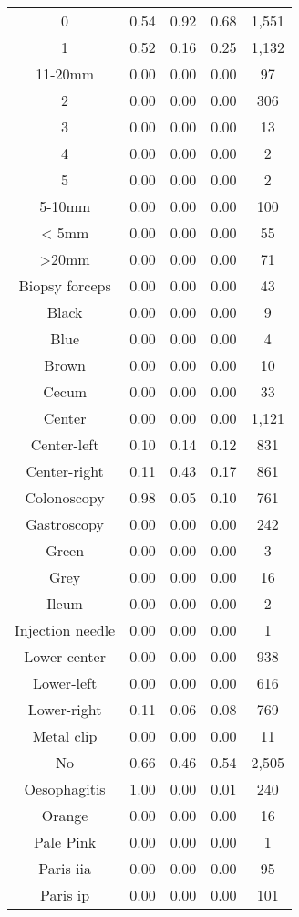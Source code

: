 \begin{center}
\begin{longtable}{|c|c|c|c|c|}
0 & 0.54 & 0.92 & 0.68 & 1,551 \\
1 & 0.52 & 0.16 & 0.25 & 1,132 \\
11-20mm & 0.00 & 0.00 & 0.00 & 97 \\
2 & 0.00 & 0.00 & 0.00 & 306 \\
3 & 0.00 & 0.00 & 0.00 & 13 \\
4 & 0.00 & 0.00 & 0.00 & 2 \\
5 & 0.00 & 0.00 & 0.00 & 2 \\
5-10mm & 0.00 & 0.00 & 0.00 & 100 \\
< 5mm & 0.00 & 0.00 & 0.00 & 55 \\
>20mm & 0.00 & 0.00 & 0.00 & 71 \\
Biopsy forceps & 0.00 & 0.00 & 0.00 & 43 \\
Black & 0.00 & 0.00 & 0.00 & 9 \\
Blue & 0.00 & 0.00 & 0.00 & 4 \\
Brown & 0.00 & 0.00 & 0.00 & 10 \\
Cecum & 0.00 & 0.00 & 0.00 & 33 \\
Center & 0.00 & 0.00 & 0.00 & 1,121 \\
Center-left & 0.10 & 0.14 & 0.12 & 831 \\
Center-right & 0.11 & 0.43 & 0.17 & 861 \\
Colonoscopy & 0.98 & 0.05 & 0.10 & 761 \\
Gastroscopy & 0.00 & 0.00 & 0.00 & 242 \\
Green & 0.00 & 0.00 & 0.00 & 3 \\
Grey & 0.00 & 0.00 & 0.00 & 16 \\
Ileum & 0.00 & 0.00 & 0.00 & 2 \\
Injection needle & 0.00 & 0.00 & 0.00 & 1 \\
Lower-center & 0.00 & 0.00 & 0.00 & 938 \\
Lower-left & 0.00 & 0.00 & 0.00 & 616 \\
Lower-right & 0.11 & 0.06 & 0.08 & 769 \\
Metal clip & 0.00 & 0.00 & 0.00 & 11 \\
No & 0.66 & 0.46 & 0.54 & 2,505 \\
Oesophagitis & 1.00 & 0.00 & 0.01 & 240 \\
Orange & 0.00 & 0.00 & 0.00 & 16 \\
Pale Pink & 0.00 & 0.00 & 0.00 & 1 \\
Paris iia & 0.00 & 0.00 & 0.00 & 95 \\
Paris ip & 0.00 & 0.00 & 0.00 & 101 \\

\end{longtable}
\end{center}
